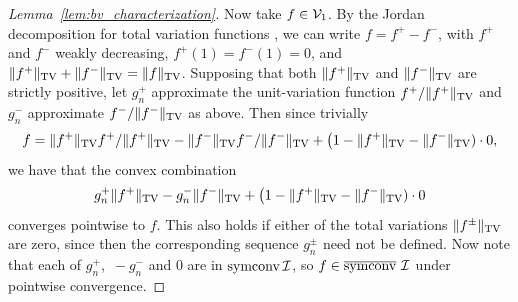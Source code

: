 \begin{proof}[Lemma~\ref{lem:bv_characterization}]
  Now take $f \in \mathcal{V}_1$.
  By the Jordan decomposition for
  total variation functions
  \citep{royden1988real},
  we can write
  $f = f^+ - f^-$,
  with
  $f^+$ and $f^-$ weakly decreasing,
  $f^+(1) = f^-(1) = 0$,
  and
  $\|f^+\|_{\mathrm{TV}} + \|f^-\|_{\mathrm{TV}} = \|f\|_{\mathrm{TV}}$.
  Supposing that both
  $\|f^+\|_{\mathrm{TV}}$ and $\|f^-\|_{\mathrm{TV}}$
  are strictly positive, let
  $g_n^+$ approximate
  the unit-variation function
  $f^+/\|f^+\|_{\mathrm{TV}}$
  and
  $g_n^-$ approximate $f^-/\|f^-\|_{\mathrm{TV}}$
  as above.
  Then since trivially
  \begin{align*}
    f =
    \|f^+\|_{\mathrm{TV}} f^+ / \|f^+\|_{\mathrm{TV}}
    - \|f^-\|_{\mathrm{TV}} f^- / \|f^-\|_{\mathrm{TV}}
    + \big(1 - \|f^+\|_{\mathrm{TV}} - \|f^-\|_{\mathrm{TV}}) \cdot 0,
  \end{align*}
  we have that
  the convex combination
  \begin{align*}
    g_n^+ \|f^+\|_{\mathrm{TV}}
    - g_n^- \|f^-\|_{\mathrm{TV}}
    + \big(1 - \|f^+\|_{\mathrm{TV}} - \|f^-\|_{\mathrm{TV}}) \cdot 0
  \end{align*}
  converges pointwise to $f$.
  This also holds if either of the total variations
  $\|f^\pm\|_{\mathrm{TV}}$
  are zero,
  since then the corresponding sequence $g_n^\pm$
  need not be defined.
  Now note that each of
  $g_n^+$, $\,-g_n^-$ and $0$
  are in $\operatorname{symconv} \mathcal{I}$, so
  $f \in \overline{\operatorname{symconv}} \ \mathcal{I}$
  under pointwise convergence.
\end{proof}

